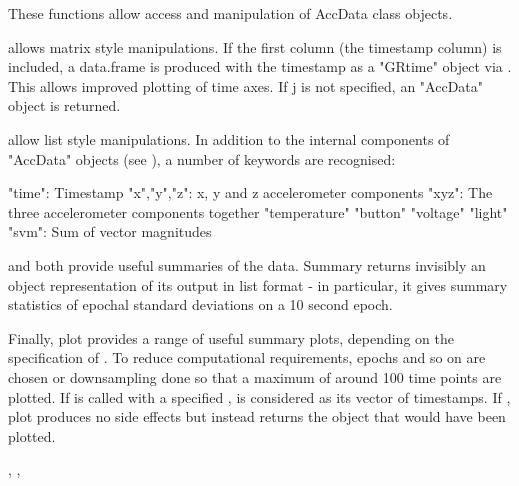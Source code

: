 \documentclass[a4paper]{book}
\begin{document}
\begin{Details}\relax
These functions allow access and manipulation of AccData class objects.

\code{[} allows matrix style manipulations. If the first column (the timestamp column) is included, a data.frame is produced with the timestamp as a "GRtime" object via . This allows improved plotting of time axes. If j is not specified, an "AccData" object is returned.

\code{\$} allow list style manipulations. In addition to the internal components of "AccData" objects (see ), a number of keywords are recognised:

"time": Timestamp
"x","y","z": x, y and z accelerometer components
"xyz": The three accelerometer components together
"temperature"
"button"
"voltage"
"light"
"svm": Sum of vector magnitudes

 and  both provide useful summaries of the data. Summary returns invisibly an object representation of its output in list format - in particular, it gives summary statistics of epochal standard deviations on a 10 second epoch.

Finally, plot provides a range of useful summary plots, depending on the specification of . To reduce computational requirements, epochs and so on are chosen or downsampling done so that a maximum of around 100 time points are plotted. If  is called with a specified ,  is considered as its vector of timestamps. If , plot produces no side effects but instead returns the object that would have been plotted.
\end{Details}
%
\begin{SeeAlso}\relax
{}, , 
\end{SeeAlso}
%
\begin{Examples}
\end{Examples}
\end{document}
